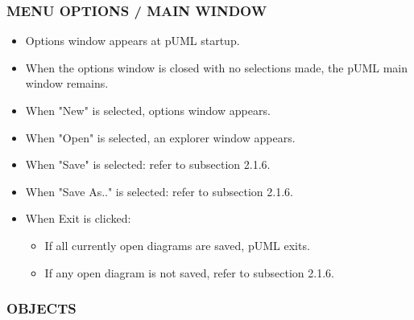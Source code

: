 \documentclass[twoside,letterpaper]{article}
\begin{document}
\bigskip


\subsubsection[MENU OPTIONS / MAIN WINDOW]
{\bfseries MENU OPTIONS / MAIN WINDOW} 
{
\begin{itemize}
\item Options window appears at pUML startup.
\item When the options window is closed with no selections made, the pUML main window remains.
\item When "New" is selected, options window appears.
\item When "Open" is selected, an explorer window appears.
\item When "Save" is selected: refer to subsection 2.1.6.
\item When "Save As.." is selected: refer to subsection 2.1.6.
\item When Exit is clicked:
\begin{itemize}
\item If all currently open diagrams are saved, pUML exits.
\item If any open diagram is not saved, refer to subsection 2.1.6.
\end{itemize}
\end{itemize}
\bigskip

\subsubsection[OBJECTS]{\bfseries OBJECTS} 

}
\end{document}
